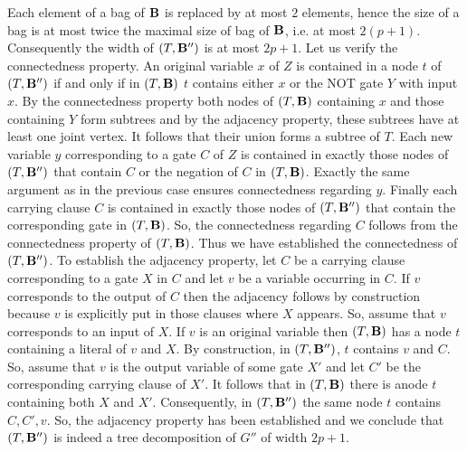 \documentclass{llncs}
\begin{document}
Each element of a bag of ${\bf B}$ is replaced by at most $2$ elements, hence the size of a bag
is at most twice the maximal size of bag of ${\bf B}$, i.e. at most $2(p+1)$. Consequently the
width of $(T,{\bf B''})$ is at most $2p+1$. Let us verify the connectedness property.
An original variable $x$ of $Z$ is contained in a node $t$ of $(T,{\bf B''})$ if and only if
in $(T,{\bf B})$ $t$ contains either $x$ or the NOT gate $Y$ with input $x$. By the connectedness property
both nodes of $(T,{\bf B})$ containing $x$ and those containing $Y$ form subtrees and by the adjacency
property, these subtrees have at least one joint vertex. It follows that their union forms a subtree of $T$.
Each new variable $y$ corresponding to a gate $C$ of $Z$ is contained in exactly those nodes of $(T,{\bf B''})$
that contain $C$ or the negation of $C$ in $(T,{\bf B})$. Exactly the same argument as in the previous case
ensures connectedness regarding $y$. Finally each carrying clause $C$ is contained in exactly those nodes of $(T,{\bf B''})$
that contain the corresponding gate in $(T,{\bf B})$. So, the connectedness regarding $C$ follows from the connectedness
property of $(T,{\bf B})$. Thus we have established the connectedness of $(T,{\bf B''})$.
To establish the adjacency property, let $C$ be a carrying clause corresponding to a gate $X$ in $C$ and 
let $v$ be a variable occurring in $C$. If $v$ corresponds to the output of $C$ then the adjacency follows by
construction because $v$ is explicitly put in those clauses where $X$ appears. So, assume that $v$ corresponds to
an input of $X$. If $v$ is an original variable then $(T,{\bf B})$ has a node $t$ containing a literal of $v$ and $X$.
By construction, in $(T,{\bf B''})$, $t$ contains $v$ and $C$. So, assume that $v$ is the output variable of some gate
$X'$ and let $C'$ be the corresponding carrying clause of $X'$. It follows that in $(T,{\bf B})$ there is anode $t$
containing both $X$ and $X'$. Consequently, in $(T,{\bf B''})$ the same node $t$ contains $C,C',v$. So, the adjacency 
property has been established and we conclude that $(T,{\bf B''})$ is indeed a tree decomposition of $G''$ of
width $2p+1$.
\end{document}
